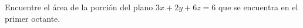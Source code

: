 \item Encuentre el área de la porción del plano $3x + 2y + 6z = 6$ que se encuentra en el primer octante.
